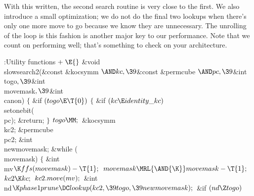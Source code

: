 With this written, the second search routine is very close to the
first.  We also introduce a small optimization; we do not do the
final two lookups when there's only one more move to go because
we know they are unnecessary.  The unrolling of the loop is this
fashion is another major key to our performance.  Note that we
count on  performing well; that's something to check on your
architecture.

\Y\B\4:Utility functions\X${}\mathrel+\E{}$\6
\&{void} \\{slowsearch2}(\&{const} \&{kocsymm} ${}{\AND}\\{kc},\39{}$\&{const} %
\&{permcube} ${}{\AND}\\{pc},\39{}$\&{int} \\{togo}${},\39{}$\&{int} %
\\{movemask}${},\39{}$\&{int} \\{canon})\1\1\2\2\6
${}\{{}$\1\6
\&{if} ${}(\\{togo}\E\T{0}){}$\5
${}\{{}$\1\6
\&{if} ${}(\\{kc}\E\\{identity\_kc}){}$\1\5
\\{setonebit}(\\{pc});\2\6
\&{return};\6
\4${}\}{}$\2\6
${}\\{togo}\MM;{}$\7
\&{kocsymm} \\{kc2};\6
\&{permcube} \\{pc2};\6
\&{int} \\{newmovemask};\7
\&{while} (\\{movemask})\5
${}\{{}$\1\6
\&{int} \\{mv}${}\K\\{ffs}(\\{movemask})-\T{1};{}$\7
${}\\{movemask}\MRL{\AND{\K}}\\{movemask}-\T{1};{}$\6
${}\\{kc2}\K\\{kc};{}$\6
${}\\{kc2}.\\{move}(\\{mv});{}$\7
\&{int} \\{nd}${}\K\\{phase1prune}\DC\\{lookup}(\\{kc2},\39\\{togo},\39%
\\{newmovemask});{}$\7
\&{if} ${}(\\{nd}\Z\\{togo}){}$\5
